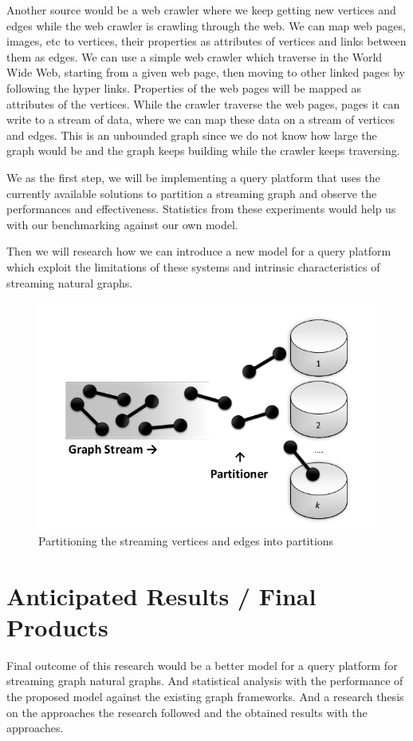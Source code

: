 \documentclass[12pt]{article}
\begin{document}
Another source would be a web crawler where we keep getting new vertices and edges while the web crawler is crawling through the web. We can map web pages, images, etc to vertices, their properties as attributes of vertices and links between them as edges. We can use a simple web crawler which traverse in the World Wide Web, starting from a given web page, then moving to other linked pages by following the hyper links. Properties of the web pages will be mapped as attributes of the vertices. While the crawler traverse the web pages, pages it can write to a stream of data, where we can map these data on a stream of vertices and edges. This is an unbounded graph since we do not know how large the graph would be and the graph keeps building while the crawler keeps traversing.

We as the first step, we will be implementing a query platform that uses the currently available solutions to partition a streaming graph and observe the performances and effectiveness. Statistics from these experiments would help us with our benchmarking against our own model. 

Then we will research how we can introduce a new model for a query platform which exploit the limitations of these systems and intrinsic characteristics of streaming natural graphs.

\begin{figure}
\centering
\includegraphics[width=\textwidth]{image01.png}
\caption{Partitioning the streaming vertices and edges into partitions }
\label{fig:partitioning}
\end{figure}

\clearpage 
\section{Anticipated Results / Final Products }
Final outcome of this research would be a better model for a query platform for streaming graph natural graphs. And statistical analysis with the performance of the proposed model against the existing graph frameworks. And a research thesis on the approaches the research followed and the obtained results with the approaches. 
 
\end{document}
